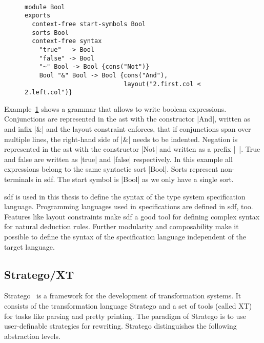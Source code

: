 \begin{figure}
\begin{example}{~}
\begin{lstlisting}[language=sdf]
module Bool
exports
  context-free start-symbols Bool
  sorts Bool
  context-free syntax
    "true"  -> Bool
    "false" -> Bool
    "~" Bool -> Bool {cons("Not")}
    Bool "&" Bool -> Bool {cons("And"),
                           layout("2.first.col < 2.left.col")}
\end{lstlisting}
\label{ex:sdf-grammar}
\end{example}
\end{figure}

Example~\ref{ex:sdf-grammar} shows a grammar that allows to write
boolean expressions. Conjunctions are represented in the \gls{ast}
with the constructor \code|And|, written as and infix \code|&| and the
layout constraint enforces, that if conjunctions span over multiple
lines, the right-hand side of \code|&| needs to be indented. Negation
is represented in the \gls{ast} with the constructor \code|Not| and
written as a prefix \code|~|. True and false are written as
\code|true| and \code|false| respectively. In this example all
expressions belong to the same syntactic sort \code|Bool|. Sorts
represent non-terminals in \gls{sdf}. The start symbol is \code|Bool|
as we only have a single sort.

\gls{sdf} is used in this thesis to define the syntax of the type
system specification language. Programming languages used in
specifications are defined in \gls{sdf}, too. Features like layout
constraints make \gls{sdf} a good tool for defining complex syntax for
natural deduction rules. Further modularity and composability make it
possible to define the syntax of the specification language
independent of the target language.

\subsection{Stratego/XT}
Stratego~\cite{Visser01} is a framework for the development of
transformation systems. It consists of the transformation language
Stratego and a set of tools (called XT) for tasks like parsing and
pretty printing. The paradigm of Stratego is to use user-definable
strategies for rewriting. Stratego distinguishes the following
abstraction levels.

